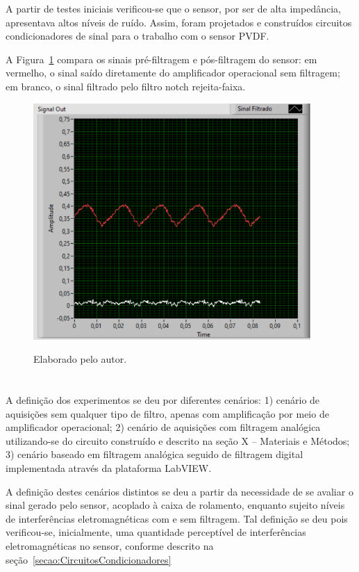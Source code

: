 \documentclass[
	12pt,				
	oneside,			
	a4paper,			
	english,			
	brazil,			
	]{abntex2ppgsi}
\begin{document}
A partir de testes iniciais verificou-se que o sensor, por ser de alta impedância, apresentava altos níveis de ruído. Assim, foram projetados e construídos circuitos condicionadores de sinal para o trabalho com o sensor PVDF.  

A Figura~\ref{sinal_filtrado_maquina_desligada} compara os sinais pré-filtragem e pós-filtragem do sensor: em vermelho, o sinal saído diretamente do amplificador operacional sem filtragem; em branco, o sinal filtrado pelo filtro notch rejeita-faixa. 

\begin{figure}[H]
\centering
\caption {Elaborado pelo autor.}
\includegraphics[width=\textwidth,height=90mm,keepaspectratio]{GraficosAnalise/sinal_filtrado_maquina_desligada}
\label{sinal_filtrado_maquina_desligada}
\end{figure} 



\section{}

A definição dos experimentos se deu por diferentes cenários: 1) cenário de aquisições sem qualquer tipo de filtro, apenas com amplificação por meio de amplificador operacional; 2) cenário de aquisições com filtragem analógica utilizando-se do circuito construído e descrito na seção X – Materiais e Métodos; 3) cenário baseado em filtragem analógica seguido de filtragem digital implementada através da plataforma LabVIEW.

A definição destes cenários distintos se deu a partir da necessidade de se avaliar o sinal gerado pelo sensor, acoplado à caixa de rolamento, enquanto sujeito níveis de interferências eletromagnéticas com e sem filtragem. Tal definição se deu pois verificou-se, inicialmente, uma quantidade perceptível de interferências eletromagnéticas no sensor, conforme descrito na seção~\ref{secao:CircuitosCondicionadores}
\end{document}
